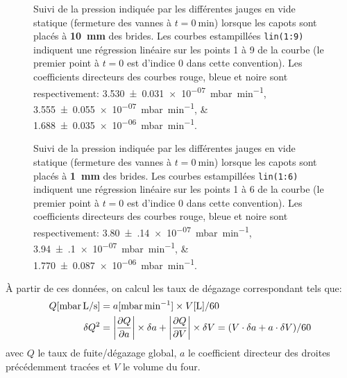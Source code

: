 \begin{figure}
    \centering
    
    \caption{Suivi de la pression indiquée par les différentes jauges en vide statique (fermeture des vannes à $t=\SI{0}{\minute}$) lorsque les capots sont placés à \textbf{\SI{10}{\milli\meter}} des brides. Les courbes estampillées \texttt{lin(1:9)} indiquent une régression linéaire sur les points 1 à 9 de la courbe (le premier point à $t=0$ est d'indice 0 dans cette convention). Les coefficients directeurs des courbes rouge, bleue et noire sont respectivement: \SIlist{3.530(31)e-07; 3.555(55)e-07; 1.688(35)e-06}{\milli\bar\per\minute}.}
    \label{fig:videStatique_10mm}
\end{figure}

\begin{figure}
    \centering
    
    \caption{Suivi de la pression indiquée par les différentes jauges en vide statique (fermeture des vannes à $t=\SI{0}{\minute}$) lorsque les capots sont placés à \textbf{\SI{1}{\milli\meter}} des brides. Les courbes estampillées \texttt{lin(1:6)} indiquent une régression linéaire sur les points 1 à 6 de la courbe (le premier point à $t=0$ est d'indice 0 dans cette convention). Les coefficients directeurs des courbes rouge, bleue et noire sont respectivement: \SIlist{3.80(14)e-07; 3.94(10)e-07; 1.770(87)e-06}{\milli\bar\per\minute}.}
    \label{fig:videStatique_1mm}
\end{figure}

À partir de ces données, on calcul les taux de dégazage correspondant tels que:
\begin{align*}
    Q[\si{\milli\bar.\liter\per\second}] &= a[\si{\milli\bar\per\minute}]\times V[\si{\liter}] / 60\\
    \delta Q^2 &= \left\vert {\frac{\partial Q}{\partial a}} \right\vert\times \delta a + \left\vert {\frac{\partial Q}{\partial V}} \right\vert\times \delta V = (V\cdot\delta a + a\cdot\delta V)/60
\end{align*}
avec $Q$ le taux de fuite/dégazage global, $a$ le coefficient directeur des droites précédemment tracées et $V$ le volume du four.


